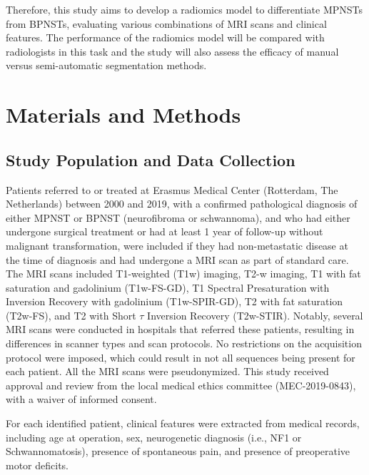 Therefore, this study aims to develop a radiomics model to differentiate MPNSTs from BPNSTs, evaluating various combinations of MRI scans and clinical features.
The performance of the radiomics model will be compared with radiologists in this task and the study will also assess the efficacy of manual versus semi-automatic segmentation methods.

\section{Materials and Methods}
\subsection{Study Population and Data Collection}
Patients referred to or treated at Erasmus Medical Center (Rotterdam, The Netherlands) between 2000 and 2019, with a confirmed pathological diagnosis of either MPNST or BPNST (neurofibroma or schwannoma), and who had either undergone surgical treatment or had at least 1 year of follow-up without malignant transformation, were included if they had non-metastatic disease at the time of diagnosis and had undergone a MRI scan as part of standard care.
The MRI scans included T1-weighted (T1w) imaging, T2-w imaging, T1 with fat saturation and gadolinium (T1w-FS-GD), T1 Spectral Presaturation with Inversion Recovery with gadolinium (T1w-SPIR-GD), T2 with fat saturation (T2w-FS), and T2 with Short $\tau$ Inversion Recovery (T2w-STIR).
Notably, several MRI scans were conducted in hospitals that referred these patients, resulting in differences in scanner types and scan protocols.
No restrictions on the acquisition protocol were imposed, which could result in not all sequences being present for each patient.
All the MRI scans were pseudonymized.
This study received approval and review from the local medical ethics committee (MEC-2019-0843), with a waiver of informed consent.

For each identified patient, clinical features were extracted from medical records, including age at operation, sex, neurogenetic diagnosis (i.e., NF1 or Schwannomatosis), presence of spontaneous pain, and presence of preoperative motor deficits.

